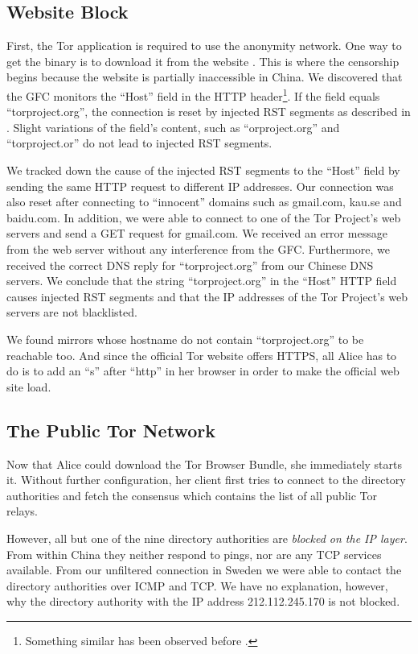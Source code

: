 \documentclass[runningheads,a4paper]{llncs}
\begin{document}
\subsection{Website Block}
First, the Tor application is required to use the anonymity network. One way to get the binary is to
download it from the website \cite{tpo0}. This is where the censorship begins because the website is
partially inaccessible in China. We discovered that the GFC monitors the ``Host'' field in the HTTP
header\footnote{Something similar has been observed before \cite{tpo2}.}. If the field equals
``torproject.org'', the connection is reset by injected RST segments as described in
\cite{Clayton2006}. Slight variations of the field's content, such as ``orproject.org'' and
``torproject.or'' do not lead to injected RST segments.

We tracked down the cause of the injected RST segments to the ``Host'' field by sending the
same HTTP request to different IP addresses. Our connection was also reset after connecting to
``innocent'' domains such as gmail.com, kau.se and baidu.com. In addition, we were able to connect
to one of the Tor Project's web servers and send a GET request for gmail.com. We received an error
message from the web server without any interference from the GFC. Furthermore, we received the
correct DNS reply for ``torproject.org'' from our Chinese DNS servers. We conclude that the
string ``torproject.org'' in the ``Host'' HTTP field causes injected RST segments and
that the IP addresses of the Tor Project's web servers are not blacklisted.

We found mirrors whose hostname do not contain ``torproject.org'' to be reachable too. And since the
official Tor website offers HTTPS, all Alice has to do is to add an ``s'' after ``http'' in her
browser in order to make the official web site load.

\subsection{The Public Tor Network}
Now that Alice could download the Tor Browser Bundle, she immediately starts it. Without further
configuration, her client first tries to connect to the directory authorities and fetch the
consensus which contains the list of all public Tor relays.

However, all but one of the nine directory authorities are \emph{blocked on the IP layer}. From
within China they neither respond to pings, nor are any TCP services available. From our unfiltered
connection in Sweden we were able to contact the directory authorities over ICMP and TCP. We have no
explanation, however, why the directory authority with the IP address 212.112.245.170 is not
blocked.
\end{document}
